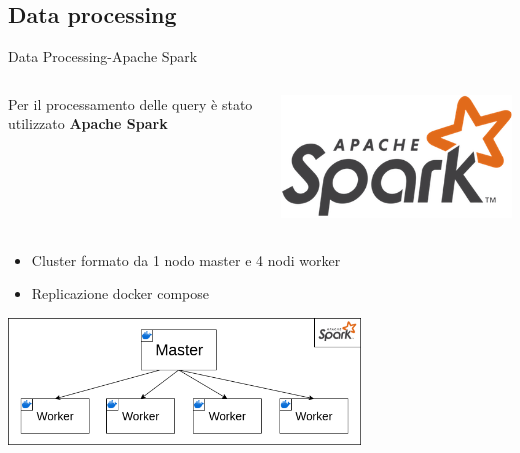 \documentclass[13pt,aspectratio=169,t,xcolor=table]{beamer}
\begin{document}
\subsection{Data processing}
\begin{frame}{Data Processing-Apache Spark}
    \begin{columns}
    
            Per il processamento delle query è stato utilizzato \textbf{Apache Spark}
        
            \begin{minipage}{0.5\textwidth}
                \raggedleft
                \includegraphics[width=.9\textwidth]{res/spark_icon.png}
            \end{minipage}
    \end{columns}

    \vspace{0.5cm}
    
    \begin{itemize}
        \item Cluster formato da 1 nodo master e 4 nodi worker
        \item Replicazione docker compose
    \end{itemize}
    \begin{adjustbox}{margin=0.5cm, center}
        \includegraphics[width=0.7\textwidth]{res/spark_cluster.png}
    \end{adjustbox}


\end{frame}
\end{document}
